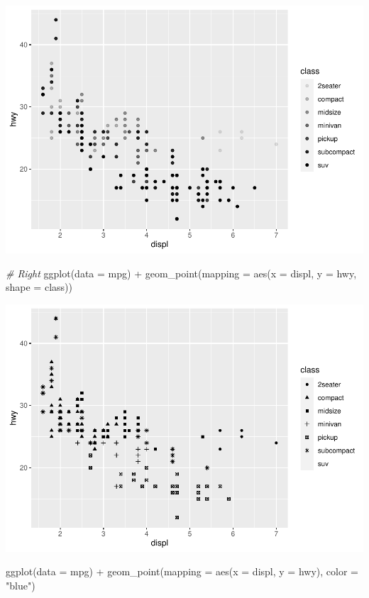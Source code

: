 \documentclass[
]{article}
\newenvironment{Shaded}{\begin{snugshade}}{\end{snugshade}}
\newcommand{\AttributeTok}[1]{\textcolor[rgb]{0.77,0.63,0.00}{#1}}
\newcommand{\CommentTok}[1]{\textcolor[rgb]{0.56,0.35,0.01}{\textit{#1}}}
\newcommand{\FunctionTok}[1]{\textcolor[rgb]{0.00,0.00,0.00}{#1}}
\newcommand{\NormalTok}[1]{#1}
\newcommand{\SpecialCharTok}[1]{\textcolor[rgb]{0.00,0.00,0.00}{#1}}
\newcommand{\StringTok}[1]{\textcolor[rgb]{0.31,0.60,0.02}{#1}}
\begin{document}
\includegraphics{Journal_files/figure-latex/unnamed-chunk-39-3.pdf}

\begin{Shaded}
\begin{Highlighting}[]
\CommentTok{\# Right}
\FunctionTok{ggplot}\NormalTok{(}\AttributeTok{data =}\NormalTok{ mpg) }\SpecialCharTok{+} 
  \FunctionTok{geom\_point}\NormalTok{(}\AttributeTok{mapping =} \FunctionTok{aes}\NormalTok{(}\AttributeTok{x =}\NormalTok{ displ, }\AttributeTok{y =}\NormalTok{ hwy, }\AttributeTok{shape =}\NormalTok{ class))}
\end{Highlighting}
\end{Shaded}

\includegraphics{Journal_files/figure-latex/unnamed-chunk-39-4.pdf}

\begin{Shaded}
\begin{Highlighting}[]
\FunctionTok{ggplot}\NormalTok{(}\AttributeTok{data =}\NormalTok{ mpg) }\SpecialCharTok{+} 
  \FunctionTok{geom\_point}\NormalTok{(}\AttributeTok{mapping =} \FunctionTok{aes}\NormalTok{(}\AttributeTok{x =}\NormalTok{ displ, }\AttributeTok{y =}\NormalTok{ hwy), }\AttributeTok{color =} \StringTok{"blue"}\NormalTok{)}
\end{Highlighting}
\end{Shaded}
\end{document}
